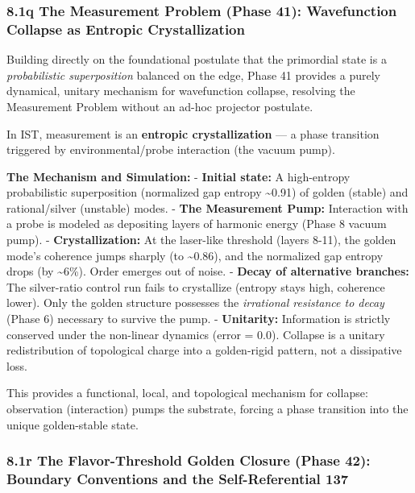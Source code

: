 \documentclass[
]{article}
\begin{document}
\subsubsection{8.1q The Measurement Problem (Phase 41): Wavefunction
Collapse as Entropic
Crystallization}\label{q-the-measurement-problem-phase-41-wavefunction-collapse-as-entropic-crystallization}

Building directly on the foundational postulate that the primordial
state is a \emph{probabilistic superposition} balanced on the edge,
Phase 41 provides a purely dynamical, unitary mechanism for wavefunction
collapse, resolving the Measurement Problem without an ad-hoc projector
postulate.

In IST, measurement is an \textbf{entropic crystallization} --- a phase
transition triggered by environmental/probe interaction (the vacuum
pump).

\textbf{The Mechanism and Simulation:} - \textbf{Initial state:} A
high-entropy probabilistic superposition (normalized gap entropy
\textasciitilde0.91) of golden (stable) and rational/silver (unstable)
modes. - \textbf{The Measurement Pump:} Interaction with a probe is
modeled as depositing layers of harmonic energy (Phase 8 vacuum pump). -
\textbf{Crystallization:} At the laser-like threshold (layers 8-11), the
golden mode's coherence jumps sharply (to \textasciitilde0.86), and the
normalized gap entropy drops (by \textasciitilde6\%). Order emerges out
of noise. - \textbf{Decay of alternative branches:} The silver-ratio
control run fails to crystallize (entropy stays high, coherence lower).
Only the golden structure possesses the \emph{irrational resistance to
decay} (Phase 6) necessary to survive the pump. - \textbf{Unitarity:}
Information is strictly conserved under the non-linear dynamics (error =
0.0). Collapse is a unitary redistribution of topological charge into a
golden-rigid pattern, not a dissipative loss.

This provides a functional, local, and topological mechanism for
collapse: observation (interaction) pumps the substrate, forcing a phase
transition into the unique golden-stable state.

\subsubsection{8.1r The Flavor-Threshold Golden Closure (Phase 42):
Boundary Conventions and the Self-Referential
137}\label{r-the-flavor-threshold-golden-closure-phase-42-boundary-conventions-and-the-self-referential-137}
\end{document}
